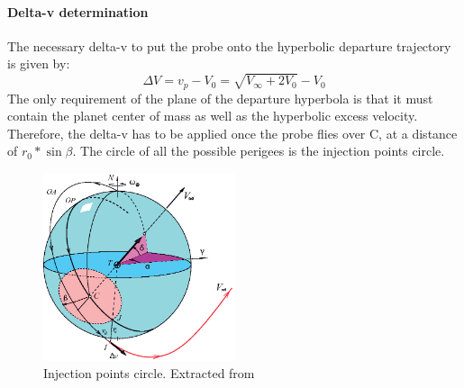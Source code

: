 \paragraph{Delta-v determination}
The necessary delta-v to put the probe onto the hyperbolic departure trajectory is given by:
\begin{equation}
	\Delta V=v_p-V_0=\sqrt{V_\infty+2V_0}-V_0
\end{equation}
The only requirement of the plane of the departure hyperbola is that it must contain the planet center of mass as well as the hyperbolic excess velocity. Therefore, the delta-v has to be applied once the probe flies over C, at a distance of $r_0*\sin \beta$. The circle of all the possible perigees is the injection points circle.
\begin{figure}[H]
	\centering
	\includegraphics[width=0.5\textwidth]{././images/1stStage3} 
	\caption{Injection points circle. Extracted from~\cite{PCA}}
	\label{fig:InjectionCircle}
\end{figure}


